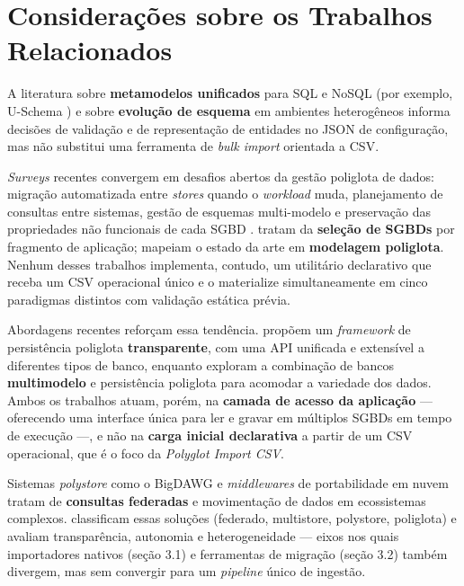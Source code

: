 \section{Considerações sobre os Trabalhos Relacionados}

A literatura sobre \textbf{metamodelos unificados} para SQL e NoSQL (por exemplo, U-Schema
\cite{fernandezcandel2022unified}) e sobre \textbf{evolução de esquema} em ambientes heterogêneos
\cite{chillon2023propagating,chillon2024schema} informa decisões de validação e de representação de entidades
no JSON de configuração, mas não substitui uma ferramenta de \textit{bulk import} orientada
a CSV.

\textit{Surveys} recentes convergem em desafios abertos da gestão poliglota de dados:
migração automatizada entre \textit{stores} quando o \textit{workload} muda, planejamento
de consultas entre sistemas, gestão de esquemas multi-modelo e preservação das propriedades
não funcionais de cada SGBD \cite{kiehn2022polyglot,glake2022towards}.
 tratam da \textbf{seleção de SGBDs} por fragmento de
aplicação;  mapeiam o estado da arte em \textbf{modelagem
poliglota}. Nenhum desses trabalhos implementa, contudo, um utilitário declarativo que
receba um CSV operacional único e o materialize simultaneamente em cinco paradigmas
distintos com validação estática prévia.

Abordagens recentes reforçam essa tendência.  propõem um
\textit{framework} de persistência poliglota \textbf{transparente}, com uma {API} unificada e
extensível a diferentes tipos de banco, enquanto  exploram a
combinação de bancos \textbf{multimodelo} e persistência poliglota para acomodar a variedade dos
dados. Ambos os trabalhos atuam, porém, na \textbf{camada de acesso da aplicação} --- oferecendo
uma interface única para ler e gravar em múltiplos SGBDs em tempo de execução ---, e não na
\textbf{carga inicial declarativa} a partir de um CSV operacional, que é o foco da
\textit{Polyglot Import CSV}.

Sistemas \textit{polystore} como o BigDAWG \cite{duggan2015bigdawg} e \textit{middlewares}
de portabilidade em nuvem \cite{kaur2020middleware} tratam de \textbf{consultas federadas} e
movimentação de dados em ecossistemas complexos.  classificam
essas soluções (federado, multistore, polystore, poliglota) e avaliam transparência,
autonomia e heterogeneidade --- eixos nos quais importadores nativos (seção 3.1) e
ferramentas de migração (seção 3.2) também divergem, mas sem convergir para um
\textit{pipeline} único de ingestão.

